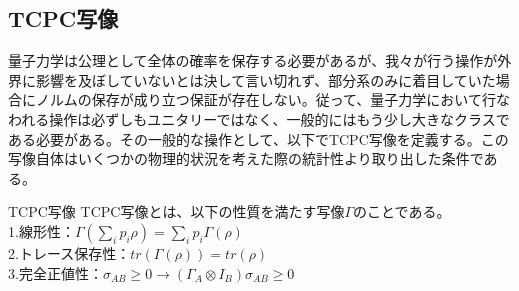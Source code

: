 \documentclass[a4paper,10.5pt]{article}
\numberwithin{equation}{section}
\begin{document}
\subsection{TCPC写像}
量子力学は公理として全体の確率を保存する必要があるが、我々が行う操作が外界に影響を及ぼしていないとは決して言い切れず、部分系のみに着目していた場合にノルムの保存が成り立つ保証が存在しない。従って、量子力学において行なわれる操作は必ずしもユニタリーではなく、一般的にはもう少し大きなクラスである必要がある。その一般的な操作として、以下でTCPC写像を定義する。この写像自体はいくつかの物理的状況を考えた際の統計性より取り出した条件である。
\begin{defbox}{TCPC写像}
TCPC写像とは、以下の性質を満たす写像$\Gamma$のことである。\\
1.線形性：$\Gamma (\sum_{i}p_{i}\rho)=\sum_{i}p_{i}\Gamma(\rho)$\\
2.トレース保存性：$tr(\Gamma (\rho))=tr(\rho)$\\
3.完全正値性：$\sigma_{AB}\geq0 \to (\Gamma_{A} \otimes I_{B})\sigma_{AB} \geq 0$
\end{defbox}
\end{document}
